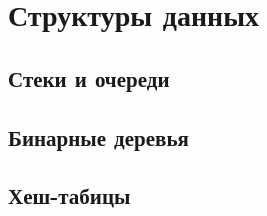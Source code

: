 \chapter{Структуры данных}

\section{Стеки и очереди}

\section{Бинарные деревья}

\section{Хеш-табицы}
